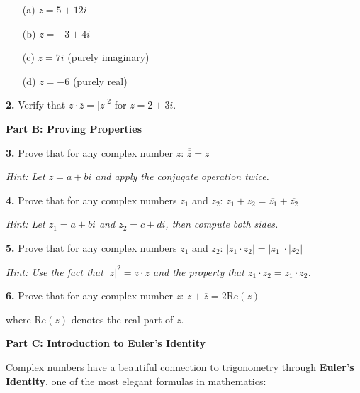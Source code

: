 \documentclass[12pt]{article}
\begin{document}
\begin{enumerate}
\item[(a)] $z = 5 + 12i$
\vspace{2cm}

\item[(b)] $z = -3 + 4i$
\vspace{2cm}

\item[(c)] $z = 7i$ (purely imaginary)
\vspace{2cm}

\item[(d)] $z = -6$ (purely real)
\vspace{2cm}
\end{enumerate}

\textbf{2.} Verify that $z \cdot \overline{z} = |z|^2$ for $z = 2 + 3i$.
\vspace{3cm}

\textbf{Part B: Proving Properties}

\textbf{3.} Prove that for any complex number $z$: $\overline{\overline{z}} = z$

\textit{Hint: Let $z = a + bi$ and apply the conjugate operation twice.}
\vspace{4cm}

\textbf{4.} Prove that for any complex numbers $z_1$ and $z_2$: $\overline{z_1 + z_2} = \overline{z_1} + \overline{z_2}$

\textit{Hint: Let $z_1 = a + bi$ and $z_2 = c + di$, then compute both sides.}
\vspace{5cm}

\newpage

\textbf{5.} Prove that for any complex numbers $z_1$ and $z_2$: $|z_1 \cdot z_2| = |z_1| \cdot |z_2|$

\textit{Hint: Use the fact that $|z|^2 = z \cdot \overline{z}$ and the property that $\overline{z_1 \cdot z_2} = \overline{z_1} \cdot \overline{z_2}$.}
\vspace{6cm}

\textbf{6.} Prove that for any complex number $z$: $z + \overline{z} = 2 \text{Re}(z)$

where $\text{Re}(z)$ denotes the real part of $z$.
\vspace{4cm}

\textbf{Part C: Introduction to Euler's Identity}

Complex numbers have a beautiful connection to trigonometry through \textbf{Euler's Identity}, one of the most elegant formulas in mathematics:
\end{document}
